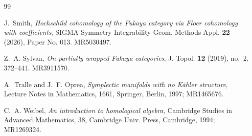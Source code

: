 \documentclass[a4paper, reqno, 11pt]{amsart}
\theoremstyle{definition}
\begin{document}
\begin{thebibliography}{99}
	
	
	
	J.~Smith,
	\emph{Hochschild cohomology of the Fukaya category via Floer cohomology with coefficients},
	SIGMA Symmetry Integrability Geom. Methods Appl. \textbf{22} (2026), Paper No. 013. MR5030497.
	
	Z.~A. Sylvan,
	\emph{On partially wrapped Fukaya categories},
	J. Topol. \textbf{12} (2019), no.~2, 372--441. MR3911570.
	
	A.~Tralle and J.~F. Oprea,
	\emph{Symplectic manifolds with no K\"ahler structure},
	Lecture Notes in Mathematics, 1661,
	Springer, Berlin, 1997; MR1465676.
	
	C.~A. Weibel,
	\emph{An introduction to homological algebra},
	Cambridge Studies in Advanced Mathematics, 38,
	Cambridge Univ. Press, Cambridge, 1994; MR1269324.
	
\end{thebibliography}
\end{document}
